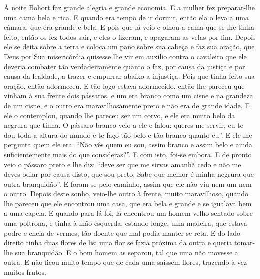 À noite Bohort faz grande alegria e grande economia. E a mulher fez preparar-lhe
uma cama bela e rica. E quando era tempo de ir dormir, então ela o leva a uma
câmara, que era grande e bela. E pois que lá veio e olhou a cama que se lhe
tinha feito, então os fez todos sair, e eles o fizeram, e apagaram as velas por
fim. Depois ele se deita sobre a terra e coloca um pano sobre sua cabeça e faz
sua oração, que Deus por Sua misericórdia quisesse lhe vir em auxílio contra o
cavaleiro que ele deveria combater tão verdadeiramente quanto o faz, por causa
da justiça e por causa da lealdade, a trazer e empurrar abaixo a injustiça.
Pois que tinha feito sua oração, então adormeceu. E tão logo estava adormecido,
então lhe pareceu que vinham à sua frente dois pássaros, e um era branco como
um cisne e na grandeza de um cisne, e o outro era maravilhosamente preto e não
era de grande idade. E ele o contemplou, quando lhe pareceu ser um corvo, e ele
era muito belo da negrura que tinha. O pássaro branco veio a ele e falou:
queres me servir, eu te dou toda a altura do mundo e te faço tão belo e tão
branco quanto eu”. E ele lhe pergunta quem ele era. “Não vês quem eu sou, assim
branco e assim belo e ainda suficientemente mais do que consideras?”. E com
isto, foi-se embora. E de pronto veio o pássaro preto e lhe diz: “deve ser que
me sirvas amanhã cedo e não me deves odiar por causa disto, que sou preto. Sabe
que melhor é minha negrura que outra branquidão”. E foram-se pelo caminho,
assim que ele não viu nem um nem o outro. Depois deste sonho, veio-lhe outro à
frente, muito maravilhoso, quando lhe pareceu que ele encontrou uma casa, que
era bela e grande e se igualava bem a uma capela. E quando para lá foi, lá
encontrou um homem velho sentado sobre uma poltrona, e tinha à mão esquerda, 
estando longe, uma madeira, que estava podre e cheia de vermes, tão doente que
mal podia manter-se reta. E do lado direito tinha duas flores de lis; uma flor
se fazia próxima da outra e queria tomar-lhe sua branquidão. E o bom homem as
separou, tal que uma não movesse a outra. E não ficou muito tempo que de cada
uma saíssem flores, trazendo à vez muitos frutos.

